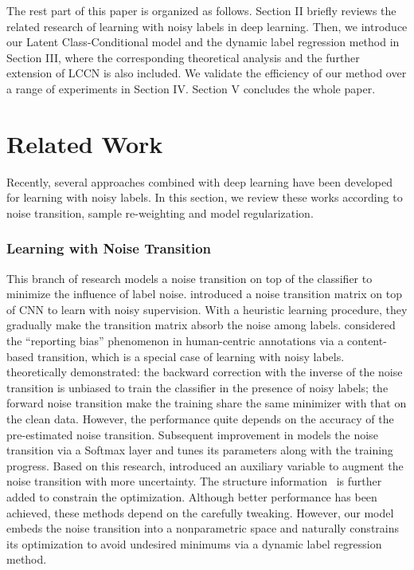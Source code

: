 \documentclass[journal]{IEEEtran}
\begin{document}
The rest part of this paper is organized as follows. Section II briefly reviews the related research of learning with noisy labels in deep learning. Then, we introduce our Latent Class-Conditional model and the dynamic label regression method in Section III, where the corresponding theoretical analysis and the further extension of LCCN is also included. We validate the efficiency of our method over a range of experiments in Section IV. Section V concludes the whole paper.

\section{Related Work}
Recently, several approaches combined with deep learning have been developed for learning with noisy labels. In this section, we review these works according to noise transition, sample re-weighting and model regularization.
\subsubsection{Learning with Noise Transition}
This branch of research models a noise transition on top of the classifier to minimize the influence of label noise. \citet{sukhbaatar2014training} introduced a noise transition matrix on top of CNN to learn with noisy supervision. With a heuristic learning procedure, they gradually make the transition matrix absorb the noise among labels.
\citet{MisraNoisy16} considered the ``reporting bias'' phenomenon in human-centric annotations via a content-based transition, which is a special case of learning with noisy labels. \citet{patrini2017making} theoretically demonstrated: the backward correction with the inverse of the noise transition is unbiased to train the classifier in the presence of noisy labels; the forward noise transition make the training share the same minimizer with that on the clean data. However, the performance quite depends on the accuracy of the pre-estimated noise transition. 
Subsequent improvement in \cite{goldberger2016training} models the noise transition via a Softmax layer and tunes its parameters along with the training progress. Based on this research, \citet{yao2017deep} introduced an auxiliary variable to augment the noise transition with more uncertainty. The structure information~\cite{Han2018MaskingAN} is further added to constrain the optimization. Although better performance has been achieved, these methods depend on the carefully tweaking. However, our model embeds the noise transition into a nonparametric space and naturally constrains its optimization to avoid undesired minimums via a dynamic label regression method.
\end{document}
